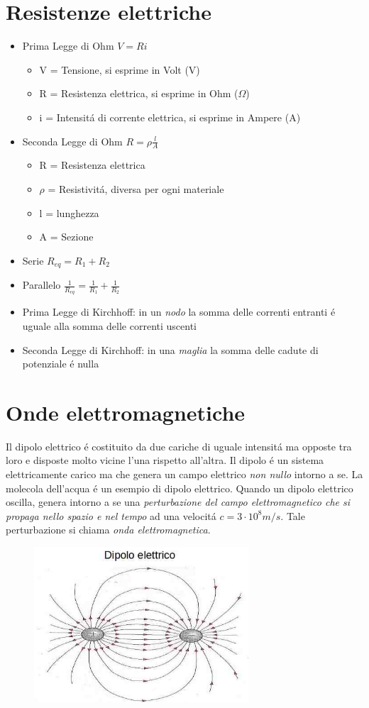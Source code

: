 \documentclass[17pt]{article}
\begin{document}
\section{Resistenze elettriche}

\begin{itemize}
	\item Prima Legge di Ohm $V = Ri$
		\begin{itemize}
			\item V = Tensione, si esprime in Volt (V)
			\item R = Resistenza elettrica, si esprime in Ohm ($\Omega$)
			\item i = Intensit\'a di corrente elettrica, si esprime in Ampere (A)
		\end{itemize}
	\item Seconda Legge di Ohm $R=\rho\frac{l}{A}$
		\begin{itemize}
			\item R = Resistenza elettrica
			\item $\rho$ = Resistivit\'a, diversa per ogni materiale
			\item l = lunghezza
			\item A = Sezione
		\end{itemize}
	\item Serie $R_{eq} = R_1 + R_2$
	\item Parallelo $\frac{1}{R_{eq}} = \frac{1}{R_1} + \frac{1}{R_2}$
	\item Prima Legge di Kirchhoff: in un \emph{nodo} la somma delle correnti entranti \'e uguale alla somma delle correnti uscenti
	\item Seconda Legge di Kirchhoff: in una \emph{maglia} la somma delle cadute di potenziale \'e nulla
\end{itemize}





\section{Onde elettromagnetiche}

Il dipolo elettrico \'e costituito da due cariche di uguale intensit\'a ma opposte tra loro e disposte molto vicine l'una rispetto all'altra. Il dipolo \'e un sistema elettricamente carico ma che genera un campo elettrico \emph{non nullo} intorno a se. La molecola dell'acqua \'e un esempio di dipolo elettrico. Quando un dipolo elettrico oscilla, genera intorno a se una \emph{perturbazione del campo elettromagnetico che si propaga nello spazio e nel tempo} ad una velocit\'a $c = 3\cdot 10^{8}m/s$. Tale perturbazione si chiama \emph{onda elettromagnetica}.

\begin{figure}[th]
\includegraphics[width=8cm]{dipoloElettrico.jpg}
\centering
\end{figure}
\end{document}
